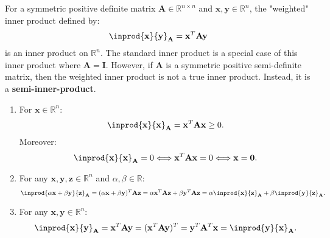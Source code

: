\documentclass{huhtakm-template-book-v2}
\begin{document}
    \begin{eg}
        For a symmetric positive definite matrix $\mathbf{A} \in \mathbb{R}^{n \times n}$ and $\mathbf{x}, \mathbf{y} \in \mathbb{R}^{n}$, the "weighted" inner product defined by:
        \begin{equation*}
            \inprod{\mathbf{x}}{\mathbf{y}}_{\mathbf{A}} = \mathbf{x}^{T}\mathbf{A}\mathbf{y}
        \end{equation*}
        is an inner product on $\mathbb{R}^{n}$. The standard inner product is a special case of this inner product where $\mathbf{A} = \mathbf{I}$. However, if $\mathbf{A}$ is a symmetric positive semi-definite matrix, then the weighted inner product is not a true inner product. Instead, it is a \textbf{semi-inner-product}.
    \end{eg}
    \begin{proofing}
        \begin{enumerate}
            \item For $\mathbf{x} \in \mathbb{R}^{n}$:
            \begin{equation*}
                \inprod{\mathbf{x}}{\mathbf{x}}_{\mathbf{A}} = \mathbf{x}^{T}\mathbf{A}\mathbf{x} \geq 0.
            \end{equation*}
            Moreover:
            \begin{equation*}
                \inprod{\mathbf{x}}{\mathbf{x}}_{\mathbf{A}} = 0 \Longleftrightarrow \mathbf{x}^{T}\mathbf{A}\mathbf{x} = 0 \Longleftrightarrow \mathbf{x} = \mathbf{0}.
            \end{equation*}
            \item For any $\mathbf{x}, \mathbf{y}, \mathbf{z} \in \mathbb{R}^{n}$ and $\alpha, \beta \in \mathbb{R}$:
            \begin{equation*}
                \inprod{\alpha\mathbf{x} + \beta\mathbf{y}}{\mathbf{z}}_{\mathbf{A}} = (\alpha\mathbf{x} + \beta\mathbf{y})^{T}\mathbf{A}\mathbf{z} = \alpha\mathbf{x}^{T}\mathbf{A}\mathbf{z} + \beta\mathbf{y}^{T}\mathbf{A}\mathbf{z} = \alpha\inprod{\mathbf{x}}{\mathbf{z}}_{\mathbf{A}} + \beta\inprod{\mathbf{y}}{\mathbf{z}}_{\mathbf{A}}.
            \end{equation*}
            \item For any $\mathbf{x}, \mathbf{y} \in \mathbb{R}^{n}$:
            \begin{equation*}
                \inprod{\mathbf{x}}{\mathbf{y}}_{\mathbf{A}} = \mathbf{x}^{T}\mathbf{A}\mathbf{y} = (\mathbf{x}^{T}\mathbf{A}\mathbf{y})^{T} = \mathbf{y}^{T}\mathbf{A}^{T}\mathbf{x} = \inprod{\mathbf{y}}{\mathbf{x}}_{\mathbf{A}}.
            \end{equation*}
        \end{enumerate}
    \end{proofing}
    \newpage
    
\end{document}
